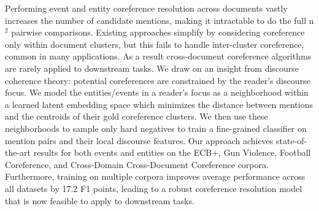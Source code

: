 Performing event and entity coreference resolution across documents vastly increases the number of candidate mentions, making it intractable to do the full n$^2$ pairwise comparisons. Existing approaches simplify by considering coreference only within document clusters, but this fails to handle inter-cluster coreference, common in many applications. As a result cross-document coreference algorithms are rarely applied to downstream tasks. We draw on an insight from discourse coherence theory: potential coreferences are constrained by the reader's discourse focus. We model the entities/events in a reader's focus as a neighborhood within a learned latent embedding space which minimizes the distance between mentions and the centroids of their gold coreference clusters. We then use these neighborhoods to sample only hard negatives to train a fine-grained classifier on mention pairs and their local discourse features. Our approach achieves state-of-the-art results for both events and entities on the ECB+, Gun Violence, Football Coreference, and Cross-Domain Cross-Document Coreference corpora. Furthermore, training on multiple corpora improves average performance across all datasets by 17.2 F1 points, leading to a robust coreference resolution model that is now feasible to apply to downstream tasks.
